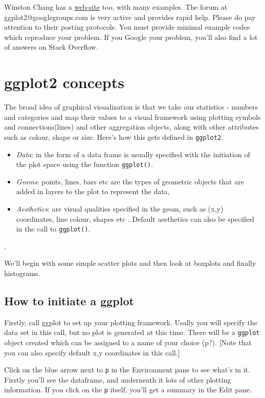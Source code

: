 \documentclass[titlepage]{book}\usepackage{knitr}
\begin{document}
Winston Chang has a \href{http://www.cookbook-r.com/}{web-site} too, with many examples. The forum at ggplot2@googlegroups.com is very active and provides rapid help.  Please do pay attention to their posting protocols.  You must provide minimal example codes which reproduce your problem. If you Google your problem, you'll also find a lot of answers on Stack Overflow.

\section{ggplot2 concepts}

The broad idea of graphical visualization is that we take our statistics - numbers and categories and map their values to a visual framework using plotting symbols and connections(lines) and other aggregation objects, along with other attributes such as colour, shape or size. Here's how this gets defined in \texttt{ggplot2}.

\begin{itemize}
\item \emph{Data}: in the form of a data frame is usually specified with the initiation of the plot space using the function \texttt{ggplot()}.
\item \emph{Geoms}: points, lines, bars etc are the types of geometric objects that are added in layers to the plot to represent the data,
\item \emph{Aesthetics}: are visual qualities specified in the geom, such as (x,y) coordinates, line colour, shapes etc .  Default aesthetics can also be specified in the call to \texttt{ggplot()}.
\end{itemize}.

We'll begin with some simple scatter plots and then look at boxplots and finally histograms.

\subsection{How to initiate a ggplot}

Firstly, call ggplot to set up your plotting framework.  Usally you will specify the data set in this call, but no plot is generated at this time.  There will be a  \texttt{ggplot} object created which can be assigned to a name of your choice (p?). [Note that you can also specify default x,y coordinates in this call.]

\begin{knitrout}
\color{fgcolor}\begin{kframe}
\begin{alltt}
 \hlkwb{<-} 
\end{alltt}
\end{kframe}
\end{knitrout}
Click on the blue arrow next to \texttt{p} in the Environment pane to see what's in it. Firstly you'll see the dataframe, and underneath it lots of other plotting information.  If you click on the \texttt{p} itself, you'll get a summary in the Edit pane.
\end{document}
